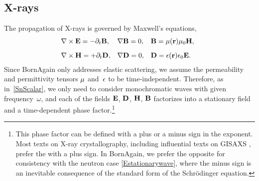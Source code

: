 %
%

\subsection{X-rays}\label{SXwave}

%
%

The propagation of X-rays is governed by Maxwell's equations,
%
\begin{equation}\label{EMaxwell}
  \begin{array}{@{}l@{\quad}l@{\quad}l}
    \Nabla\times\v{E}=-\partial_t \v{B},
   &\Nabla\v{B}=0,
   &\v{B}=\v{\mu}(\r)\mu_0\v{H},
   \\[2ex]
    \Nabla\times\v{H}=+\partial_t \v{D},
   &\Nabla\v{D}=0,
   &\v{D}=\v{\eps}(\r)\eps_0\v{E}.
  \end{array}
\end{equation}
%
%
%
%
%
%
Since BornAgain only addresses elastic scattering,
%
%
we assume the permeability and permittivity tensors $\mathbf{\mu}$ and~$\mathbf{\epsilon}$
to be time-independent.
%
Therefore, as in~\cref{SnScalar}, we only need to consider monochromatic waves
%
%
with given frequency~$\omega$,
and each of the fields $\mathbf{E}$, $\mathbf{D}$, $\mathbf{H}$, $\mathbf{B}$
factorizes into a stationary field and a time-dependent phase factor.\footnote
{This phase factor can be defined with a plus or a minus sign in the exponent.
Most texts on X-ray crystallography,
including influential texts on GISAXS \cite{ReLL09},
prefer the  with a plus sign.
%
%
%
%
In BornAgain, we prefer the opposite 
%
for consistency with the neutron case \cref{Estationarywave},
where the minus sign is an inevitable consequence
of the standard form of the Schrödinger equation.%
%
}
